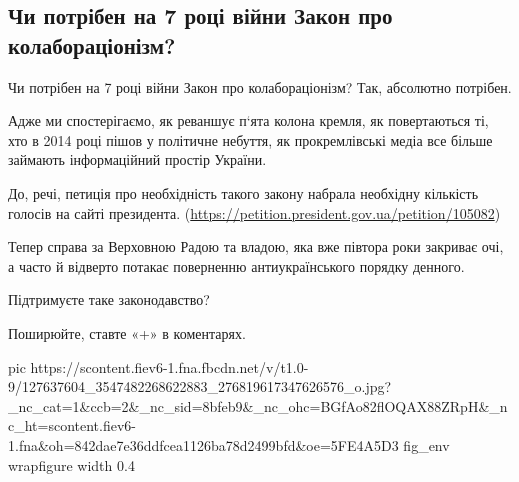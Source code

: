  
 
 
 
 
 
\subsection{Чи потрібен на 7 році війни Закон про колабораціонізм?}
\label{sec:26_11_2020.fb.promovugroup.1.kollaborazionizm}

Чи потрібен на 7 році війни Закон про колабораціонізм? Так, абсолютно потрібен.

Адже ми спостерігаємо, як реваншує п‘ята колона кремля, як повертаються ті, хто
в 2014 році пішов у політичне небуття, як прокремлівські медіа все більше
займають інформаційний простір України.

До, речі, петиція про необхідність такого закону набрала необхідну кількість
голосів на сайті президента.
(\url{https://petition.president.gov.ua/petition/105082})

Тепер справа за Верховною Радою та владою, яка вже півтора роки закриває очі, а
часто й відверто потакає поверненню антиукраїнського порядку денного.

Підтримуєте таке законодавство? 

Поширюйте, ставте «+» в коментарях.

\ifcmt
pic https://scontent.fiev6-1.fna.fbcdn.net/v/t1.0-9/127637604_3547482268622883_276819617347626576_o.jpg?_nc_cat=1&ccb=2&_nc_sid=8bfeb9&_nc_ohc=BGfAo82flOQAX88ZRpH&_nc_ht=scontent.fiev6-1.fna&oh=842dae7e36ddfcea1126ba78d2499bfd&oe=5FE4A5D3
fig_env wrapfigure
width 0.4
\fi
